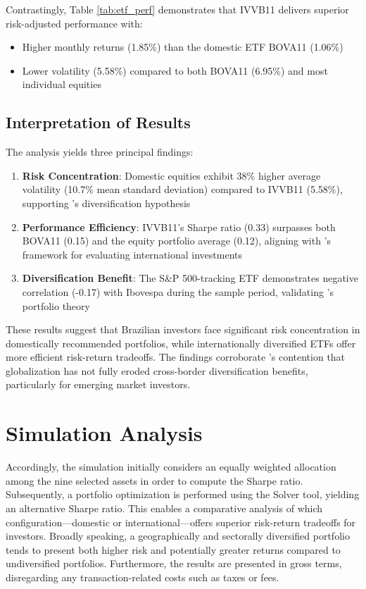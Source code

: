 \documentclass{article}
\begin{document}
Contrastingly, Table \ref{tab:etf_perf} demonstrates that IVVB11 delivers superior risk-adjusted performance with:
\begin{itemize}
    \item Higher monthly returns (1.85\%) than the domestic ETF BOVA11 (1.06\%)
    \item Lower volatility (5.58\%) compared to both BOVA11 (6.95\%) and most individual equities
\end{itemize}

\subsection{Interpretation of Results}
The analysis yields three principal findings:

\begin{enumerate}
    \item \textbf{Risk Concentration}: Domestic equities exhibit 38\% higher average volatility (10.7\% mean standard deviation) compared to IVVB11 (5.58\%), supporting \citet{Solnik_1974}'s diversification hypothesis
    
    \item \textbf{Performance Efficiency}: IVVB11's Sharpe ratio (0.33) surpasses both BOVA11 (0.15) and the equity portfolio average (0.12), aligning with \citet{Elton_2014}'s framework for evaluating international investments
    
    \item \textbf{Diversification Benefit}: The S\&P 500-tracking ETF demonstrates negative correlation (-0.17) with Ibovespa during the sample period, validating \citet{Markowitz_1952}'s portfolio theory
\end{enumerate}

These results suggest that Brazilian investors face significant risk concentration in domestically recommended portfolios, while internationally diversified ETFs offer more efficient risk-return tradeoffs. The findings corroborate \citet{Christoffersen_Errunza_2012}'s contention that globalization has not fully eroded cross-border diversification benefits, particularly for emerging market investors.

\section{Simulation Analysis}

Accordingly, the simulation initially considers an equally weighted allocation among the nine selected assets in order to compute the Sharpe ratio. Subsequently, a portfolio optimization is performed using the Solver tool, yielding an alternative Sharpe ratio. This enables a comparative analysis of which configuration---domestic or international---offers superior risk-return tradeoffs for investors. Broadly speaking, a geographically and sectorally diversified portfolio tends to present both higher risk and potentially greater returns compared to undiversified portfolios. Furthermore, the results are presented in gross terms, disregarding any transaction-related costs such as taxes or fees.
\end{document}
